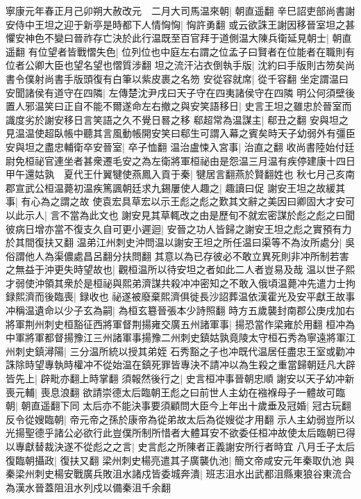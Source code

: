 寧康元年春正月己卯朔大赦改元　二月大司馬温來朝|{
	朝直遥翻}
辛巳詔吏部尚書謝安侍中王坦之迎于新亭是時都下人情恟恟|{
	恟許勇翻}
或云欲誅王謝因移晉室坦之甚懼安神色不變曰晉祚存亡決於此行温既至百官拜于道側温大陳兵衛延見朝士|{
	朝直遥翻}
有位望者皆戰慴失色|{
	位列位也中庭左右謂之位孟子曰賢者在位能者在職則有位者公卿大臣也望名望也慴質涉翻}
坦之流汗沾衣倒執手版|{
	沈約曰手版則古笏矣尚書令僕射尚書手版頭復有白筆以紫皮裹之名笏}
安從容就席|{
	從千容翻}
坐定謂温曰安聞諸侯有道守在四隣|{
	左傳楚沈尹戌曰天子守在四夷諸侯守在四隣}
明公何須壁後置人邪温笑曰正自不能不爾遂命左右撤之與安笑語移日|{
	史言王坦之雖忠於晉室而識度劣於謝安移日言笑語之久不覺日晷之移}
郗超常為温謀主|{
	郗丑之翻}
安與坦之見温温使超臥帳中聽其言風動帳開安笑曰郗生可謂入幕之賓矣時天子幼弱外有彊臣安與坦之盡忠輔衛卒安晉室|{
	卒子恤翻}
温治盧悚入宮事|{
	治直之翻}
收尚書陸始付廷尉免桓祕官連坐者甚衆遷毛安之為左衛將軍桓祕由是怨温三月温有疾停建康十四日甲午還姑孰　夏代王什翼犍使燕鳳入貢于秦|{
	犍居言翻燕於賢翻姓也}
秋七月己亥南郡宣武公桓温薨初温疾篤諷朝廷求九錫屢使人趣之|{
	趣讀曰促}
謝安王坦之故緩其事|{
	有心為之謂之故}
使袁宏具草宏以示王彪之彪之歎其文辭之美因曰卿固大才安可以此示人|{
	言不當為此文也}
謝安見其草輒改之由是歷旬不就宏密謀於彪之彪之曰聞彼病日增亦當不復支久自可更小遲迴|{
	安晉之功人皆歸之謝安王坦之彪之實預有力於其間復扶又翻}
温弟江州刺史沖問温以謝安王坦之所任温曰渠等不為汝所處分|{
	吳俗謂他人為渠儂處昌呂翻分扶問翻}
其意以為已存彼必不敢立異死則非冲所制若害之無益于沖更失時望故也|{
	觀桓温所以待安坦之者如此二人者豈易及哉}
温以世子熙才弱使沖領其衆於是桓祕與熙弟濟謀共殺冲冲密知之不敢入俄頃温薨冲先遣力士拘録熙濟而後臨喪|{
	録收也}
祕遂被廢棄熙濟俱徙長沙詔葬温依漢霍光及安平獻王故事冲稱温遺命以少子玄為嗣|{
	為桓玄簒晉張本少詩照翻}
時方五歲襲封南郡公庚戌加右將軍荆州刺史桓豁征西將軍督荆揚雍交廣五州諸軍事|{
	揚恐當作梁雍於用翻}
桓冲為中軍將軍都督揚豫江三州諸軍事揚豫二州刺史鎮姑孰竟陵太守桓石秀為寧遠將軍江州刺史鎮潯陽|{
	三分温所統以授其弟姪}
石秀豁之子也冲既代温居任盡忠王室或勸冲誅除時望專執時權冲不從始温在鎮死罪皆專決不請冲以為生殺之重當歸朝廷凡大辟皆先上|{
	辟毗亦翻上時掌翻}
須報然後行之|{
	史言桓冲事晉朝忠順}
謝安以天子幼冲新喪元輔|{
	喪息浪翻}
欲請崇德太后臨朝王彪之曰前世人主幼在襁褓母子一體故可臨朝|{
	朝直遥翻下同}
太后亦不能決事要須顧問大臣今上年出十歲垂及冠婚|{
	冠古玩翻}
反令從嫂臨朝|{
	帝元帝之孫於康帝為從弟故太后為從嫂從才用翻}
示人主幼弱豈所以光揚聖德乎諸公必欲行此豈僕所制所惜者大體耳安不欲委任桓冲故使太后臨朝已得以專獻替裁決遂不從彪之之言|{
	史言彪之所陳者正義謝安所行者時宜}
八月壬子太后復臨朝攝政|{
	復扶又翻}
梁州刺史楊亮遣其子廣襲仇池|{
	簡文帝咸安元年秦取仇池}
與秦梁州刺史楊安戰廣兵敗沮水諸戍皆委城奔潰|{
	班志沮水出武都沮縣東狼谷東流合為漢水晉蓋阻沮水列戍以備秦沮千余翻}

